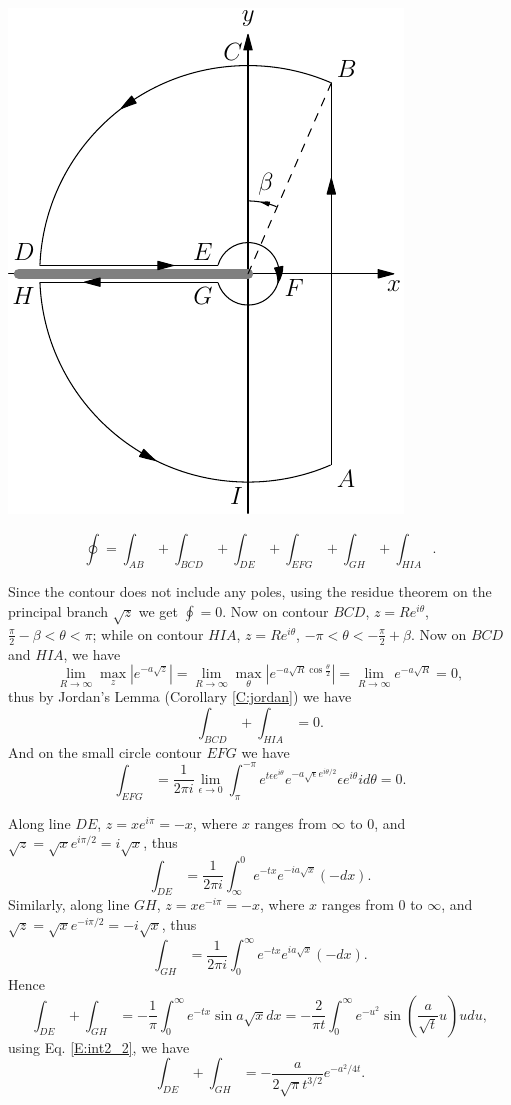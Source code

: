 \begin{marginfigure} 
  \includegraphics{graphics/contour.pdf}
\end{marginfigure}

\[
  \oint = \int_{AB} + \int_{BCD} + \int_{DE} + \int_{EFG} + \int_{GH}
          + \int_{HIA}.
\]

Since the contour does not include any poles, using the residue theorem on the
principal branch $\sqrt{z}$ we get $\oint =0$. Now on contour $BCD$, 
$z=R e^{i\theta}$, $\frac{\pi}{2}-\beta <\theta <\pi$; while on contour $HIA$, 
$z=R e^{i\theta}$, $-\pi <\theta < -\frac{\pi}{2}+\beta$. Now on $BCD$ and
$HIA$, we have
\[
	\lim_{R\to \infty} \max_z |e^{-a\sqrt{z}}|
	= \lim_{R\to \infty} \max_{\theta} | e^{-a\sqrt{R} \cos\frac{\theta}{2}} |
	= \lim_{R\to \infty} e^{-a\sqrt{R}}
	= 0,
\]
thus by Jordan's Lemma (Corollary \ref{C:jordan}) we have
\[
  \int_{BCD} + \int_{HIA} = 0.
\]
And on the small circle contour $EFG$ we have
\[
	\int_{EFG} 
	= \frac{1}{2\pi i} 
	  \lim_{\epsilon\to 0} \int_{\pi}^{-\pi} e^{t\epsilon e^{i\theta}}
	    e^{-a\sqrt{\epsilon} e^{i\theta /2}} \epsilon e^{i\theta} i d\theta
	= 0.
\]

Along line $DE$, $z=x e^{i\pi}=-x$, where $x$ ranges from $\infty$ to $0$, and 
$\sqrt{z}=\sqrt{x} e^{i\pi /2}= i\sqrt{x}$, thus
\[
	\int_{DE} = \frac{1}{2\pi i} \int_{\infty}^0 e^{-tx} e^{-i a \sqrt{x}} (-dx).
\]
Similarly, along line $GH$, $z=x e^{-i\pi}=-x$, where $x$ ranges from $0$ to
$\infty$, and $\sqrt{z}=\sqrt{x} e^{-i\pi/2} = -i\sqrt{x}$, thus 
\[
	\int_{GH} = \frac{1}{2\pi i} \int^{\infty}_0 e^{-tx} e^{i a \sqrt{x}} (-dx).
\]
Hence
\[
	\int_{DE} + \int_{GH}
	= -\frac{1}{\pi} \int_0^{\infty} e^{-tx} \sin a\sqrt{x} dx
	= -\frac{2}{\pi t} 
	  \int_0^{\infty} e^{-u^2} \sin \left( \frac{a}{\sqrt{t}} u \right) u du,
\]
using Eq. \ref{E:int2_2}, we have
\[
	\int_{DE} + \int_{GH}
	= - \frac{a}{2\sqrt{\pi} t^{3/2}} e^{-a^2/4t}.
\]

